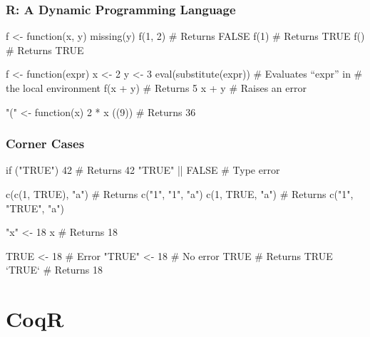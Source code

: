 \documentclass{beamer}
\newcommand\ignore[1]{}
\begin{document}
\begin{frame}[fragile]
    \frametitle{R: A Dynamic Programming Language}

\begin{Rcode}
f <- function(x, y) missing(y)
f(1, 2)                          # Returns FALSE
f(1)                             # Returns TRUE
f()                              # Returns TRUE
\end{Rcode}

\pause

\begin{Rcode}
f <- function(expr) {
    x <- 2
    y <- 3
    eval(substitute(expr))       # Evaluates “expr” in
                                 # the local environment
  }
f(x + y)                         # Returns 5
x + y                            # Raises an error
\end{Rcode}

\pause

\begin{Rcode}
"(" <- function(x) 2 * x
((9))                            # Returns 36
\end{Rcode}
\ignore) %

\end{frame}

\begin{frame}[fragile]
    \frametitle{Corner Cases}

\begin{Rcode}
if ("TRUE") 42            # Returns 42
"TRUE" || FALSE           # Type error
\end{Rcode}

\begin{Rcode}
c(c(1, TRUE), "a")        # Returns c("1", "1", "a")
c(1, TRUE, "a")           # Returns c("1", "TRUE", "a")
\end{Rcode}

\begin{Rcode}
"x" <- 18
x                         # Returns 18

TRUE <- 18                # Error
"TRUE" <- 18              # No error
TRUE                      # Returns TRUE
`TRUE`                    # Returns 18
\end{Rcode}

\end{frame}

\section{CoqR}
\end{document}
